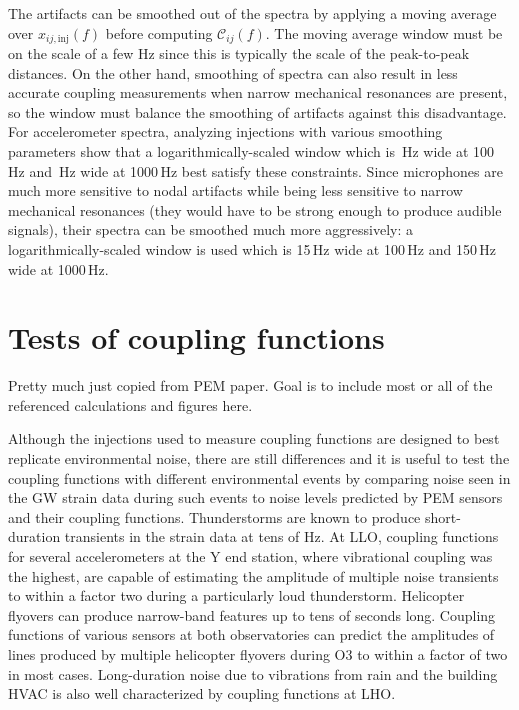 The artifacts can be smoothed out of the spectra by applying a moving average over $x_{ij,\mathrm{inj}}(f)$ before computing $\mathcal{C}_{ij}(f)$.
The moving average window must be on the scale of a few Hz since this is typically the scale of the peak-to-peak distances.
On the other hand, smoothing of spectra can also result in less accurate coupling measurements when narrow mechanical resonances are present, so the window must balance the smoothing of artifacts against this disadvantage.
For accelerometer spectra, analyzing injections with various smoothing parameters show that a logarithmically-scaled window which is \XX\,Hz wide at 100\,Hz and \XX\,Hz wide at 1000\,Hz best satisfy these constraints.
Since microphones are much more sensitive to nodal artifacts while being less sensitive to narrow mechanical resonances (they would have to be strong enough to produce audible signals), their spectra can be smoothed much more aggressively: a logarithmically-scaled window is used which is 15\,Hz wide at 100\,Hz and 150\,Hz wide at 1000\,Hz.

\section{Tests of coupling functions}

{\color{red}
Pretty much just copied from PEM paper.
Goal is to include most or all of the referenced calculations and figures here.}

Although the injections used to measure coupling functions are designed to best replicate environmental noise, there are still differences and it is useful to test the coupling functions with different environmental events by comparing noise seen in the \ac{GW} strain data during such events to noise levels predicted by PEM sensors and their coupling functions.
Thunderstorms are known to produce short-duration transients in the strain data at tens of Hz.
At \ac{LLO}, coupling functions for several accelerometers at the Y end station, where vibrational coupling was the highest, are capable of estimating the amplitude of multiple noise transients to within a factor two during a particularly loud thunderstorm.%
Helicopter flyovers can produce narrow-band features up to tens of seconds long.
Coupling functions of various sensors at both observatories can predict the amplitudes of lines produced by multiple helicopter flyovers during O3 to within a factor of two in most cases.%
Long-duration noise due to vibrations from rain and the building \ac{HVAC} is also well characterized by coupling functions at \ac{LHO}.%

